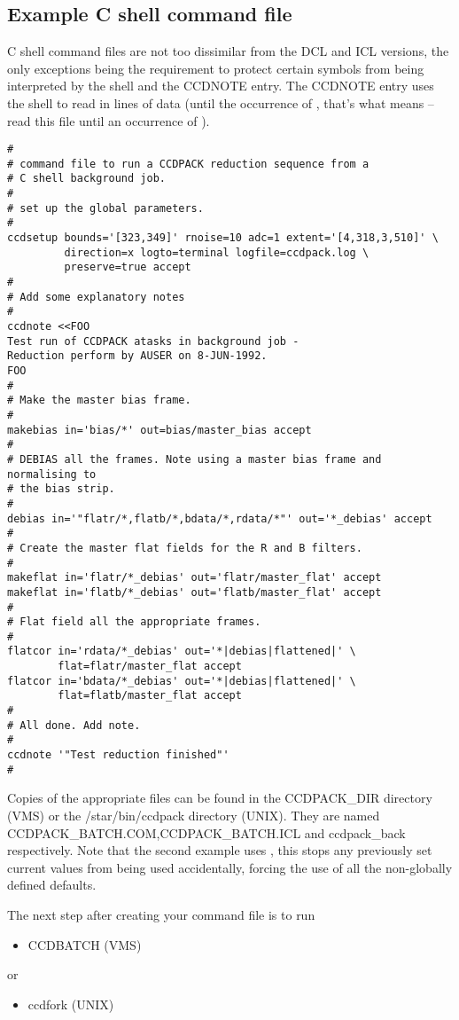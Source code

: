 \subsection{Example C shell command file}

C shell command files are not too dissimilar from the DCL and ICL
versions, the only exceptions being the requirement to protect certain
symbols from being interpreted by the shell and the CCDNOTE entry. The
CCDNOTE entry uses the shell to read in lines of data (until the
occurrence of , that's what  means -- read this
file until an occurrence of ).

\begin{myquote}
\begin{verbatim}
#
# command file to run a CCDPACK reduction sequence from a
# C shell background job.
#
# set up the global parameters.
#
ccdsetup bounds='[323,349]' rnoise=10 adc=1 extent='[4,318,3,510]' \
         direction=x logto=terminal logfile=ccdpack.log \
         preserve=true accept
#
# Add some explanatory notes
#
ccdnote <<FOO
Test run of CCDPACK atasks in background job -
Reduction perform by AUSER on 8-JUN-1992.
FOO
#
# Make the master bias frame.
#
makebias in='bias/*' out=bias/master_bias accept
#
# DEBIAS all the frames. Note using a master bias frame and normalising to
# the bias strip.
#
debias in='"flatr/*,flatb/*,bdata/*,rdata/*"' out='*_debias' accept
#
# Create the master flat fields for the R and B filters.
#
makeflat in='flatr/*_debias' out='flatr/master_flat' accept
makeflat in='flatb/*_debias' out='flatb/master_flat' accept
#
# Flat field all the appropriate frames.
#
flatcor in='rdata/*_debias' out='*|debias|flattened|' \
        flat=flatr/master_flat accept
flatcor in='bdata/*_debias' out='*|debias|flattened|' \
        flat=flatb/master_flat accept
#
# All done. Add note.
#
ccdnote '"Test reduction finished"'
#
\end{verbatim}
\end{myquote}

Copies of the appropriate files can be found in the CCDPACK\_DIR
directory (VMS) or the /star/bin/ccdpack directory (UNIX). They are
named CCDPACK\_BATCH.COM,\newline CCDPACK\_BATCH.ICL and ccdpack\_back
respectively. Note that the second example uses , this stops any
previously set current values from being used accidentally, forcing the
use of all the non-globally defined defaults.

The next step after creating your command file is to run
\begin{itemize}
\item CCDBATCH (VMS)
\end{itemize}
or
\begin{itemize}
\item ccdfork (UNIX)
\end{itemize}

